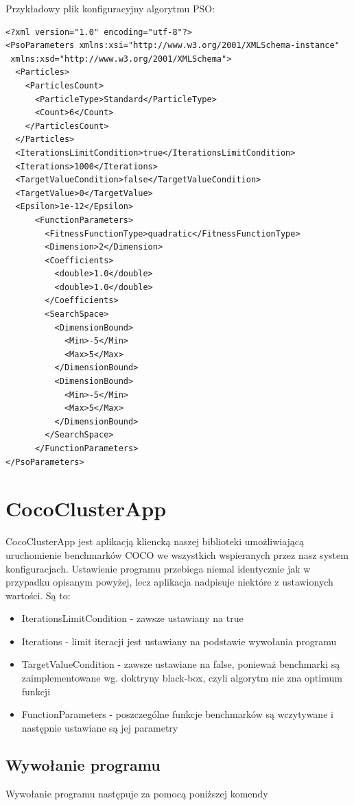 \documentclass[12pt, twoside, openany, abstract=on]{report}
\theoremstyle{definition}
\begin{document}
\clearpage
Przykładowy plik konfiguracyjny algorytmu PSO:
\lstset{language=XML}
\begin{lstlisting}[frame=single]
<?xml version="1.0" encoding="utf-8"?>
<PsoParameters xmlns:xsi="http://www.w3.org/2001/XMLSchema-instance"
 xmlns:xsd="http://www.w3.org/2001/XMLSchema">
  <Particles>
    <ParticlesCount>
      <ParticleType>Standard</ParticleType>
      <Count>6</Count>
    </ParticlesCount>
  </Particles>
  <IterationsLimitCondition>true</IterationsLimitCondition>
  <Iterations>1000</Iterations>
  <TargetValueCondition>false</TargetValueCondition>
  <TargetValue>0</TargetValue>
  <Epsilon>1e-12</Epsilon>
      <FunctionParameters>
        <FitnessFunctionType>quadratic</FitnessFunctionType>
        <Dimension>2</Dimension>
        <Coefficients>
          <double>1.0</double>
          <double>1.0</double>
        </Coefficients>
        <SearchSpace>
          <DimensionBound>
            <Min>-5</Min>
            <Max>5</Max>
          </DimensionBound>
    	  <DimensionBound>
            <Min>-5</Min>
            <Max>5</Max>
          </DimensionBound>
        </SearchSpace>
      </FunctionParameters>
</PsoParameters>
\end{lstlisting}

\section{CocoClusterApp}
CocoClusterApp jest aplikacją kliencką naszej biblioteki umożliwiającą uruchomienie benchmarków COCO we wszystkich wspieranych przez nasz system konfiguracjach. Ustawienie programu przebiega niemal identycznie jak w przypadku opisanym powyżej, lecz aplikacja nadpisuje niektóre z ustawionych wartości. Są to:

\begin{itemize}
\item IterationsLimitCondition - zawsze ustawiany na true
\item Iterations - limit iteracji jest ustawiany na podstawie wywołania programu
\item TargetValueCondition - zawsze ustawiane na false, ponieważ benchmarki są zaimplementowane wg. doktryny black-box, czyli algorytm nie zna optimum funkcji
\item FunctionParameters - poszczególne funkcje benchmarków są wczytywane i następnie ustawiane są jej parametry
\end{itemize}

\subsection{Wywołanie programu}
  Wywołanie programu następuje za pomocą poniższej komendy
\end{document}
